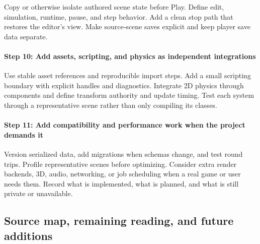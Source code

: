 \hypertarget{06-engine-ii-ch042-step-9-separate-authoring-and-runtime}{}

Copy or otherwise isolate authored scene state before Play. Define edit, simulation, runtime, pause, and step behavior. Add a clean stop path that restores the editor's view. Make source-scene saves explicit and keep player save data separate.

\paragraph{Step 10: Add assets, scripting, and physics as independent integrations}\label{06-engine-ii-ch042-step-10-add-assets-scripting-and-physics-as-independent-integrations}

\hypertarget{06-engine-ii-ch042-step-10-add-assets-scripting-and-physics-as-independent-integrations}{}

Use stable asset references and reproducible import steps. Add a small scripting boundary with explicit handles and diagnostics. Integrate 2D physics through components and define transform authority and update timing. Test each system through a representative scene rather than only compiling its classes.

\paragraph{Step 11: Add compatibility and performance work when the project demands it}\label{06-engine-ii-ch042-step-11-add-compatibility-and-performance-work-when-the-project-demands-it}

\hypertarget{06-engine-ii-ch042-step-11-add-compatibility-and-performance-work-when-the-project-demands-it}{}

Version serialized data, add migrations when schemas change, and test round trips. Profile representative scenes before optimizing. Consider extra render backends, 3D, audio, networking, or job scheduling when a real game or user needs them. Record what is implemented, what is planned, and what is still private or unavailable.

\subsection{Source map, remaining reading, and future additions}\label{06-engine-ii-ch042-source-map-remaining-reading-and-future-additions}

\hypertarget{06-engine-ii-ch042-source-map-remaining-reading-and-future-additions}{}


